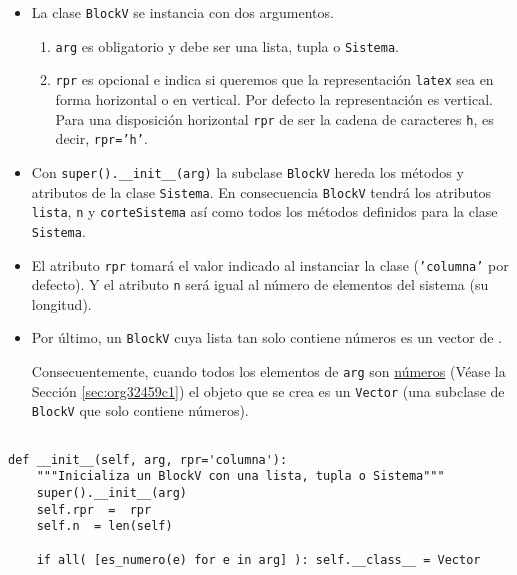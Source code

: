 \documentclass[11pt]{report}
\begin{document}
\begin{itemize}
\item La clase \texttt{BlockV} se instancia con dos argumentos. 

\begin{enumerate}
\item \texttt{arg} es obligatorio y debe ser una lista, tupla o \texttt{Sistema}.

\item \texttt{rpr} es opcional e indica si queremos que la representación
\texttt{latex} sea en forma horizontal o en vertical. Por defecto la
representación es vertical. Para una disposición horizontal \texttt{rpr}
de ser la cadena de caracteres \texttt{h}, es decir, \texttt{rpr='h'}.
\end{enumerate}

\item Con \texttt{super().\_\_init\_\_(arg)} la subclase \texttt{BlockV} hereda los métodos
y atributos de la clase \texttt{Sistema}. En consecuencia \texttt{BlockV} tendrá
los atributos \texttt{lista}, \texttt{n} y \texttt{corteSistema} así como todos los
métodos definidos para la clase \texttt{Sistema}.

\item El atributo \texttt{rpr} tomará el valor indicado al instanciar la clase
(\texttt{'columna'} por defecto). Y el atributo \texttt{n} será igual al número de
elementos del sistema (su longitud).

\item Por último, un \texttt{BlockV} cuya lista tan solo contiene números es un
vector de \R[n].

Consecuentemente, cuando todos los elementos de \texttt{arg} son \hyperref[sec:org32459c1]{números}
(Véase la Sección \ref{sec:org32459c1}) el objeto que se crea es un \texttt{Vector} (una
subclase de \texttt{BlockV} que solo contiene números).
\end{itemize}


\begin{verbatim}

def __init__(self, arg, rpr='columna'):
    """Inicializa un BlockV con una lista, tupla o Sistema"""
    super().__init__(arg)
    self.rpr  =  rpr
    self.n  = len(self)
    
    if all( [es_numero(e) for e in arg] ): self.__class__ = Vector

\end{verbatim}
\end{document}
